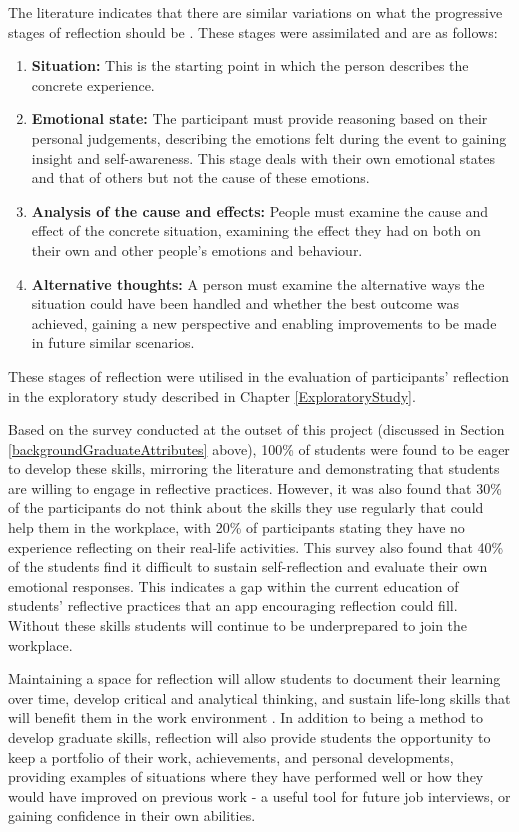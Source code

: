 \documentclass{l4proj}
\begin{document}
The literature indicates that there are similar variations on what the progressive stages of reflection should be \citep{mcdermott_developing_nodate,thurner_development_2020,bruno_reflective_2018}. These stages were assimilated and are as follows:
\begin{enumerate}
    \item \textbf{Situation:} This is the starting point in which the person describes the concrete experience.
    \item \textbf{Emotional state:} The participant must provide reasoning based on their personal judgements, describing the emotions felt during the event to gaining insight and self-awareness. This stage deals with their own emotional states and that of others but not the cause of these emotions.
    \item \textbf{Analysis of the cause and effects:} People must examine the cause and effect of the concrete situation, examining the effect they had on both on their own and other people's emotions and behaviour.
    \item \textbf{Alternative thoughts:} A person must examine the alternative ways the situation could have been handled and whether the best outcome was achieved, gaining a new perspective and enabling improvements to be made in future similar scenarios.
\end{enumerate}
These stages of reflection were utilised in the evaluation of participants' reflection in the exploratory study described in Chapter \ref{ExploratoryStudy}.

Based on the survey conducted at the outset of this project (discussed in Section \ref{backgroundGraduateAttributes} above), 100\% of students were found to be eager to develop these skills, mirroring the literature and demonstrating that students are willing to engage in reflective practices. However, it was also found that 30\% of the participants do not think about the skills they use regularly that could help them in the workplace, with 20\% of participants stating they have no experience reflecting on their real-life activities. This survey also found that 40\% of the students find it difficult to sustain self-reflection and evaluate their own emotional responses. This indicates a gap within the current education of students’ reflective practices that an app encouraging reflection could fill. Without these skills students will continue to be underprepared to join the workplace.

Maintaining a space for reflection will allow students to document their learning over time, develop critical and analytical thinking, and sustain life-long skills that will benefit them in the work environment \citep{mcdermott_developing_nodate}.  In addition to being a method to develop graduate skills, reflection will also provide students the opportunity to keep a portfolio of their work, achievements, and personal developments, providing examples of situations where they have performed well or how they would have improved on previous work - a useful tool for future job interviews, or gaining confidence in their own abilities.
\end{document}

